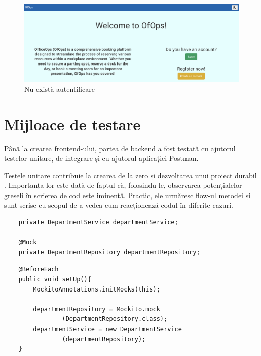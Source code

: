 \begin{figure}[!htb]
    \centering
    \includegraphics[width=0.9\linewidth]{images/pagina-nelogat.png}
    \caption{Nu există autentificare}
    \label{fig:pagina-nelogat}
\end{figure}

\section{Mijloace de testare}
Până la crearea frontend-ului, partea de backend a fost testată cu ajutorul testelor unitare, de integrare și cu ajutorul aplicației Postman.

Testele unitare contribuie la crearea de la zero și dezvoltarea unui proiect durabil \cite{citation7}. Importanța lor este dată de faptul că, folosindu-le, observarea potențialelor greșeli în scrierea de cod este iminentă. Practic, ele urmăresc flow-ul metodei și sunt scrise cu scopul de a vedea cum reacționează codul în diferite cazuri.

\begin{center}
\begin{minipage}{0.9\textwidth}
\captionsetup{type=listing}
   \begin{lstlisting}
    private DepartmentService departmentService;

    @Mock
    private DepartmentRepository departmentRepository;

        \end{lstlisting} 
\end{minipage}
\end{center}

\begin{center}
\begin{minipage}{0.9\textwidth}
\captionsetup{type=listing}
   \begin{lstlisting}
    @BeforeEach
    public void setUp(){
        MockitoAnnotations.initMocks(this);

        departmentRepository = Mockito.mock
                (DepartmentRepository.class);
        departmentService = new DepartmentService
                (departmentRepository);
    }
    \end{lstlisting} 
\end{minipage}
\end{center}

